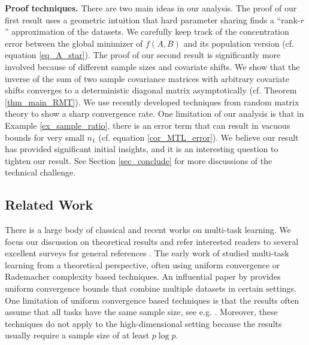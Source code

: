\documentclass[aos,preprint]{imsart}
\begin{document}
\medskip
\noindent\textbf{Proof techniques.}
There are two main ideas in our analysis. The proof of our first result uses a geometric intuition that hard parameter sharing finds a ``rank-$r$'' approximation of the datasets.
We carefully keep track of the concentration error between the global minimizer of $f(A, B)$ and its population version (cf. equation \eqref{eq_A_star}).
The proof of our second result is significantly more involved because of different sample sizes and covariate shifts. We show that the inverse of the sum of two sample covariance matrices with arbitrary covariate shifts converges to a deterministic diagonal matrix asymptotically (cf. Theorem \ref{thm_main_RMT}).
We use recently developed techniques from random matrix theory to show a sharp convergence rate.
One limitation of our analysis is that in Example \ref{ex_sample_ratio}, there is an error term that can result in vacuous bounds for very small $n_1$ (cf. equation \eqref{cor_MTL_error}).
We believe our result has provided significant initial insights, and it is an interesting question to tighten our result.
See Section \ref{sec_conclude} for more discussions of the technical challenge.



\subsection{Related Work}

There is a large body of classical and recent works on multi-task learning.
We focus our discussion on theoretical results and refer interested readers to several excellent surveys for general references \cite{PY09,ZY17,V20}.
The early work of \cite{B00,BS03,M06} studied multi-task learning from a theoretical perspective, often using uniform convergence or Rademacher complexity based techniques.
An influential paper by \cite{BBCK10} provides uniform convergence bounds that combine multiple datasets in certain settings.
One limitation of uniform convergence based techniques is that the results often assume that all  tasks have the same sample size, see e.g. \cite{B00,MPR16}.
Moreover, these techniques do not apply to the high-dimensional setting because the results usually require a sample size of at least $p \log p$.
\end{document}
